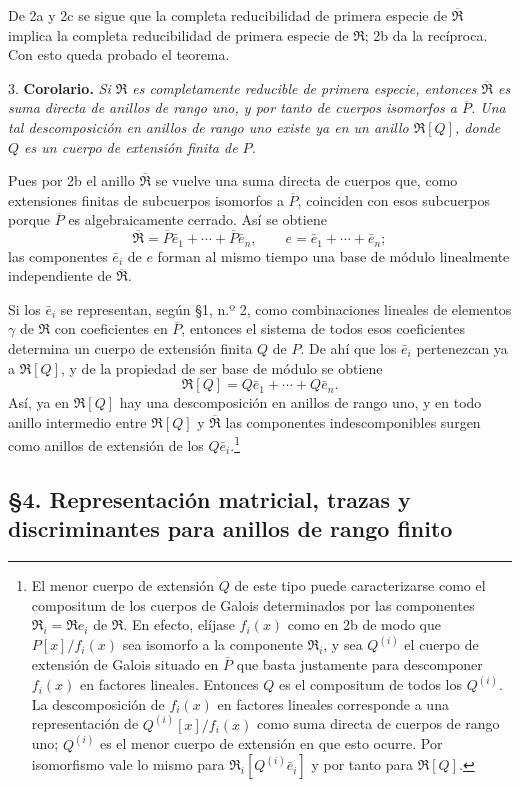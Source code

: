 \documentclass[11pt]{article}
\providecommand{\mR}{\mathfrak{R}}
\providecommand{\bR}{\overline{\mathfrak{R}}}
\providecommand{\bP}{\overline{P}}
\begin{document}
De 2a y 2c se sigue que la completa reducibilidad de primera especie de $\bR$ implica la completa reducibilidad de primera especie de $\mR$; 2b da la recíproca. Con esto queda probado el teorema.

3. \textbf{Corolario.} \emph{Si $\mR$ es completamente reducible de primera especie, entonces $\bR$ es suma directa de anillos de rango uno, y por tanto de cuerpos isomorfos a $\bP$. Una tal descomposición en anillos de rango uno existe ya en un anillo $\mR[Q]$, donde $Q$ es un cuerpo de extensión finita de $P$.}

Pues por 2b el anillo $\bR$ se vuelve una suma directa de cuerpos que, como extensiones finitas de subcuerpos isomorfos a $\bP$, coinciden con esos subcuerpos porque $\bP$ es algebraicamente cerrado. Así se obtiene
\[
        \bR=\bP\bar e_1+\cdots+\bP\bar e_n,
        \qquad e=\bar e_1+\cdots+\bar e_n;
\]
las componentes $\bar e_i$ de $e$ forman al mismo tiempo una base de módulo linealmente independiente de $\bR$.

Si los $\bar e_i$ se representan, según \S 1, n.º 2, como combinaciones lineales de elementos $\gamma$ de $\mR$ con coeficientes en $\bP$, entonces el sistema de todos esos coeficientes determina un cuerpo de extensión finita $Q$ de $P$. De ahí que los $\bar e_i$ pertenezcan ya a $\mR[Q]$, y de la propiedad de ser base de módulo se obtiene
\[
        \mR[Q]=Q\bar e_1+\cdots+Q\bar e_n.
\]
Así, ya en $\mR[Q]$ hay una descomposición en anillos de rango uno, y en todo anillo intermedio entre $\mR[Q]$ y $\bR$ las componentes indescomponibles surgen como anillos de extensión de los $Q\bar e_i$.\footnote{El menor cuerpo de extensión $Q$ de este tipo puede caracterizarse como el compositum de los cuerpos de Galois determinados por las componentes $\mR_i=\mR e_i$ de $\mR$. En efecto, elíjase $f_i(x)$ como en 2b de modo que $P[x]/f_i(x)$ sea isomorfo a la componente $\mR_i$, y sea $Q^{(i)}$ el cuerpo de extensión de Galois situado en $\bP$ que basta justamente para descomponer $f_i(x)$ en factores lineales. Entonces $Q$ es el compositum de todos los $Q^{(i)}$. La descomposición de $f_i(x)$ en factores lineales corresponde a una representación de $Q^{(i)}[x]/f_i(x)$ como suma directa de cuerpos de rango uno; $Q^{(i)}$ es el menor cuerpo de extensión en que esto ocurre. Por isomorfismo vale lo mismo para $\mR_i[Q^{(i)}\bar e_i]$ y por tanto para $\mR[Q]$.}

\subsection*{\S 4. Representación matricial, trazas y discriminantes para anillos de rango finito}
\end{document}
